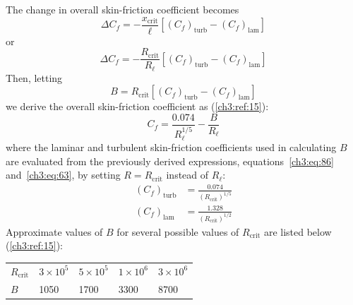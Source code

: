 The change in overall skin-friction coefficient becomes
\begin{equation}\label{ch3:eq:98}
\Delta C_f = -\frac{x_{\mathrm{crit}}}{\ell}\left[(C_f)_{\mathrm{turb}} - (C_f)_{\mathrm{lam}}\right]
\end{equation}
or
\begin{equation}\label{ch3:eq:99}
\Delta C_f = -\frac{R_{\mathrm{crit}}}{R_\ell}\left[(C_f)_{\mathrm{turb}} - (C_f)_{\mathrm{lam}}\right]
\end{equation}
Then, letting
\begin{equation}\label{ch3:eq:100}
B = R_{\mathrm{crit}}\left[(C_f)_{\mathrm{turb}} - (C_f)_{\mathrm{lam}}\right]
\end{equation}
we derive the overall skin-friction coefficient as (\ref{ch3:ref:15}):
\begin{equation}\label{ch3:eq:101}
C_f = \frac{0.074}{R_\ell^{1/5}} - \frac{B}{R_\ell}
\end{equation}
where the laminar and turbulent skin-friction coefficients used in calculating
$B$ are evaluated from the previously derived expressions, equations~\eqref{ch3:eq:86}
and~\eqref{ch3:eq:63}, by setting $R = R_{\mathrm{crit}}$ instead of $R_\ell$:
\begin{subequations}\label{ch3:eq:102}
\begin{align}
(C_f)_{\mathrm{turb}} &= \frac{0.074}{(R_{\mathrm{crit}})^{1/5}} \label{ch3:eq:102a}\\
(C_f)_{\mathrm{lam}} &= \frac{1.328}{(R_{\mathrm{crit}})^{1/2}} \label{ch3:eq:102b}
\end{align}
\end{subequations}
Approximate values of $B$ for several possible values of $R_{\mathrm{crit}}$
are listed below (\ref{ch3:ref:15}):
\begin{center}
  \begin{tabular}{@{}l@{\qquad}l@{\qquad}l@{\qquad}l@{\qquad}l@{}}
    \toprule
    $R_{\mathrm{crit}}$ & $3 \times 10^{5}$ & $5 \times 10^{5}$ & $1 \times 10^{6}$ & $3 \times 10^{6}$\\
    $B$ & 1050 & 1700 & 3300 & 8700\\
    \bottomrule
  \end{tabular}
\end{center}

